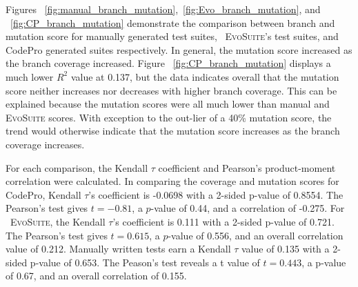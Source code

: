 Figures ~\ref{fig:manual_branch_mutation},~\ref{fig:Evo_branch_mutation}, and ~\ref{fig:CP_branch_mutation} demonstrate the comparison between branch and mutation score for manually generated test suites, ~\textsc{EvoSuite}'s test suites, and CodePro generated suites respectively.  In general, the mutation score increased as the branch coverage increased.  Figure ~\ref{fig:CP_branch_mutation} displays a much lower $R^2$ value at 0.137, but the data indicates overall that the mutation score neither increases nor decreases with higher branch coverage. This can be explained because the mutation scores were all much lower than manual and  \textsc{EvoSuite} scores. With exception to the out-lier of a 40\% mutation score, the trend would otherwise indicate that the mutation score increases as the branch coverage increases.

For each comparison, the Kendall $\tau$ coefficient and Pearson's product-moment correlation were calculated.  In comparing the coverage and mutation scores for CodePro, Kendall $\tau$'s coefficient is -0.0698 with a 2-sided p-value of 0.8554.  The Pearson's test gives $t= -0.81$, a $p$-value of 0.44, and a correlation of -0.275. 
For ~\textsc{EvoSuite}, the Kendall $\tau$'s coefficient is 0.111 with a 2-sided p-value of 0.721.  The Pearson's test gives $t= 0.615$, a $p$-value of 0.556, and an overall correlation value of 0.212.
Manually written tests earn a Kendall $\tau$ value of 0.135 with a 2-sided p-value  of 0.653.  The Peason's test reveals a t value of $t=0.443$, a p-value of 0.67, and an overall correlation of 0.155.  



